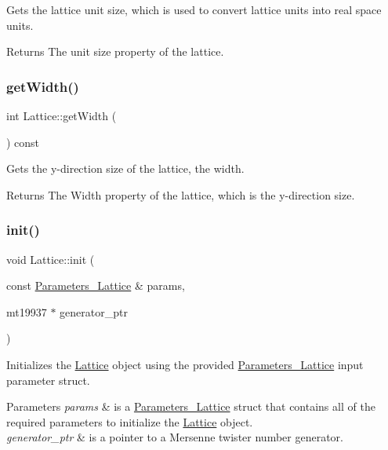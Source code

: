 Gets the lattice unit size, which is used to convert lattice units into real space units. 

\begin{DoxyReturn}{Returns}
The unit size property of the lattice. 
\end{DoxyReturn}
\mbox{\label{class_lattice_aeb60d2b8bfb02d9da8bef463f0d41428}} 
\subsubsection{\texorpdfstring{get\+Width()}{getWidth()}}
{\footnotesize\ttfamily int Lattice\+::get\+Width (\begin{DoxyParamCaption}{ }\end{DoxyParamCaption}) const}



Gets the y-\/direction size of the lattice, the width. 

\begin{DoxyReturn}{Returns}
The Width property of the lattice, which is the y-\/direction size. 
\end{DoxyReturn}
\mbox{\label{class_lattice_a4067a9617cc24fa60ca6b47fccb4c123}} 
\subsubsection{\texorpdfstring{init()}{init()}}
{\footnotesize\ttfamily void Lattice\+::init (\begin{DoxyParamCaption}\item[{const \hyperlink{struct_parameters___lattice}{Parameters\+\_\+\+Lattice} \&}]{params,  }\item[{mt19937 $\ast$}]{generator\+\_\+ptr }\end{DoxyParamCaption})}



Initializes the \hyperlink{class_lattice}{Lattice} object using the provided \hyperlink{struct_parameters___lattice}{Parameters\+\_\+\+Lattice} input parameter struct. 


\begin{DoxyParams}{Parameters}
{\em params} & is a \hyperlink{struct_parameters___lattice}{Parameters\+\_\+\+Lattice} struct that contains all of the required parameters to initialize the \hyperlink{class_lattice}{Lattice} object. \\
\hline
{\em generator\+\_\+ptr} & is a pointer to a Mersenne twister number generator. \\
\hline
\end{DoxyParams}
\mbox{\label{class_lattice_a4d37afb6ad4c67f4f6462c2f6d5c337d}} 
